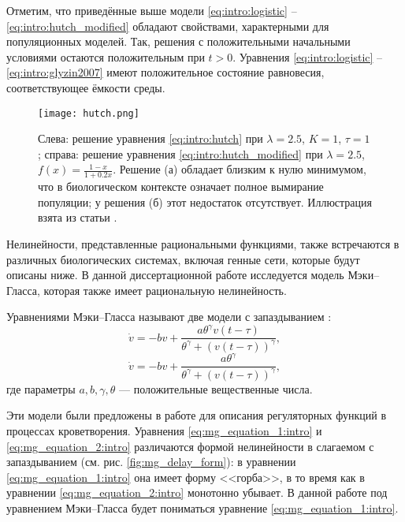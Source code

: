 
Отметим, что приведённые выше модели \eqref{eq:intro:logistic} -- \eqref{eq:intro:hutch_modified} обладают свойствами, характерными для популяционных моделей. Так, решения с положительными начальными условиями остаются положительным при $t > 0$. Уравнения \eqref{eq:intro:logistic} -- \eqref{eq:intro:glyzin2007} имеют положительное состояние равновесия, соответствующее ёмкости среды.

	
\begin{figure}
	\centering
	\texttt{[image: hutch.png]}
	\caption{Слева: решение уравнения \eqref{eq:intro:hutch} при $\lambda = 2.5$, $K = 1$, $\tau = 1$; справа: решение уравнения \eqref{eq:intro:hutch_modified} при $\lambda = 2.5$, $f(x) = \frac{1 - x}{1 + 0.2x}$. Решение (а) обладает близким к нулю минимумом, что в биологическом контексте означает полное вымирание популяции; у решения (б) этот недостаток отсутствует. Иллюстрация взята из статьи \cite{Kolesov2010}.}
	\label{fig:intro:hutch}
\end{figure}

Нелинейности, представленные рациональными функциями, также встречаются в различных биологических системах, включая генные сети, которые будут описаны ниже. В данной диссертационной работе исследуется модель Мэки--Гласса, которая также имеет рациональную нелинейность.

Уравнениями Мэки--Гласса называют две модели с запаздыванием \cite{Mackey1977, Glass1988}:
\begin{equation}
	\label{eq:mg_equation_1:intro}
	\dot{v}=-b v+\frac{a \theta^{\gamma} v(t-\tau)}{\theta^{\gamma}+(v(t-\tau))^{\gamma}},
\end{equation}
\begin{equation}
	\label{eq:mg_equation_2:intro}
	\dot{v}=-b v+\frac{a \theta^{\gamma}}{\theta^{\gamma}+(v(t-\tau))^{\gamma}},
\end{equation}
где параметры $a, b, \gamma, \theta$ --- положительные вещественные числа.

Эти модели были предложены в работе \cite{Mackey1977} для описания регуляторных функций в процессах кроветворения. Уравнения \eqref{eq:mg_equation_1:intro} и \eqref{eq:mg_equation_2:intro} различаются формой нелинейности в слагаемом с запаздыванием (см. рис. \ref{fig:mg_delay_form}): в уравнении \eqref{eq:mg_equation_1:intro} она имеет форму <<горба>>, в то время как в уравнении \eqref{eq:mg_equation_2:intro} монотонно убывает. В данной работе под уравнением Мэки--Гласса будет пониматься уравнение \eqref{eq:mg_equation_1:intro}.

